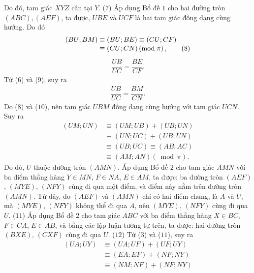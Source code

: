 \begin{multicols}{2}
	Do đó, tam giác $XYZ$ cân tại $Y$. \hfill ($7$)
	\vskip 0.05cm
	Áp dụng Bổ đề $1$ cho hai đường tròn  $(ABC), (AEF)$, ta được, $UBE$ và $UCF$ là hai tam giác đồng dạng cùng hướng. Do đó
	\begin{align*}
		\left( {BU;BM} \right) &\equiv \left( {BU;BE} \right) \equiv \left( {CU;CF} \right) \\[-0.5ex]
		&\equiv \left( {CU;CN} \right)\left( {{\rm{mod}}\;\pi } \right), \tag{$8$}
	\end{align*}
	\begin{align*}
		\dfrac{{UB}}{{UC}} = \dfrac{{BE}}{{CF}}. \tag{$9$}
	\end{align*}
	Từ ($6$) và ($9$), suy ra
	\begin{align*}
		\dfrac{{UB}}{{UC}} = \dfrac{{BM}}{{CN}}. \tag{$10$}
	\end{align*}
	Do ($8$) và ($10$), nên tam giác $UBM$ đồng dạng cùng hướng với tam giác $UCN$. Suy ra
	\begin{align*}
			\left( {UM;UN} \right) &\equiv \left( {UM;UB} \right) + \left( {UB;UN} \right) \\[-0.5ex]
			&\equiv \left( {UN;UC} \right) + \left( {UB;UN} \right)\\[-0.5ex]
			&\equiv \left( {UB;UC} \right) \equiv \left( {AB;AC} \right) \\[-0.5ex]
			&\equiv \left( {AM;AN} \right)\left( {\bmod \pi } \right).
	\end{align*}
	Do đó, $U$ thuộc đường tròn $(AMN)$.
	\vskip 0.05cm
	Áp dụng Bổ đề $2$ cho tam giác $AMN$ với ba điểm thẳng hàng $Y \in MN$, $F \in NA$, $E \in AM$, ta được: ba đường tròn $(AEF)$, $(MYE)$, $(NFY)$ cùng đi qua một điểm, và điểm này nằm trên đường tròn $(AMN)$. Từ đây, do $(AEF)$ và $(AMN)$ chỉ có hai điểm chung, là $A$ và $U$, mà $(MYE)$, $(NFY)$ không thể đi qua $A$, nên $(MYE)$, $(NFY)$ cùng đi qua $U$. \hfill ($11$)
	\vskip 0.05cm
	Áp dụng Bổ đề $2$ cho tam giác $ABC$ với ba điểm thẳng hàng $X \in BC$, $F \in CA$, $E \in AB$, và bằng các lập luận tương tự trên, ta được: hai đường tròn $(BXE)$, $(CXF)$ cùng đi \linebreak qua $U$. \hfill  ($12$)
	\vskip 0.05cm
	Từ ($3$) và ($11$), suy ra
	\begin{align*}
			\left( {UA;UY} \right) &\equiv \left( {UA;UF} \right) + \left( {UF;UY} \right) \\[-0.5ex]
			&\equiv \left( {EA;EF} \right) + \left( {NF;NY} \right)\\[-0.5ex]
			&\equiv \left( {NM;NF} \right) + \left( {NF;NY} \right) \\[-0.5ex]

\end{align*}
\end{multicols}
